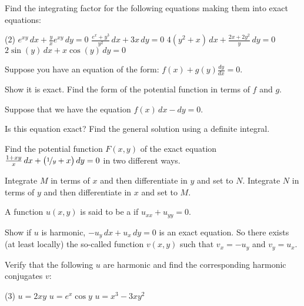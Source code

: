 \begin{exercise}
Find the integrating factor for the following equations making them into
exact equations:
\begin{tasks}(2)
\task
$e^{xy} \, dx + \frac{y}{x} e^{xy} \, dy = 0$
\task
$\frac{e^x+y^3}{y^2} \, dx + 3x \, dy = 0$
\task
$4(y^2+x) \, dx + \frac{2x+2y^2}{y} \, dy = 0$
\task
$2\sin(y) \, dx + x\cos(y)\, dy = 0$
\end{tasks}
\end{exercise}

\begin{exercise}
Suppose you have an equation of the form:
$f(x) + g(y) \frac{dy}{dx} = 0$.
\begin{tasks}
\task
Show it is exact.
\task
Find the form of the potential function in terms of $f$ and $g$.
\end{tasks}
\end{exercise}

\begin{exercise}
Suppose that we have the equation $f(x) \, dx - dy = 0$.
\begin{tasks}
\task
Is this equation exact?
\task
Find the general solution using a definite integral.
\end{tasks}
\end{exercise}

\begin{exercise}
Find the potential function $F(x,y)$ of the exact equation $\frac{1+xy}{x}\, dx +
\bigl(\nicefrac{1}{y} + x \bigr) \, dy = 0$ in two different ways.
\begin{tasks}
\task
Integrate $M$ in terms of $x$ and then differentiate in $y$ and set to
$N$.
\task
Integrate $N$ in terms of $y$ and then differentiate in $x$ and set to
$M$.
\end{tasks}
\end{exercise}

\begin{samepage}
\begin{exercise}
A function $u(x,y)$ is said to be a \emph{} if
$u_{xx} + u_{yy} = 0$.
\begin{tasks}
\task
Show if $u$ is harmonic, $-u_y \, dx + u_x \, dy = 0$ is an exact
equation.  So there exists (at least locally)
the so-called \emph{} function
$v(x,y)$ such that $v_x = -u_y$ and $v_y = u_x$.
\end{tasks}
Verify that the following $u$ are harmonic and 
find the corresponding harmonic conjugates $v$:
\begin{tasks}[resume](3)
\task $u = 2xy$
\task $u = e^x \cos y$
\task $u = x^3-3xy^2$
\end{tasks}
\end{exercise}
\end{samepage}



